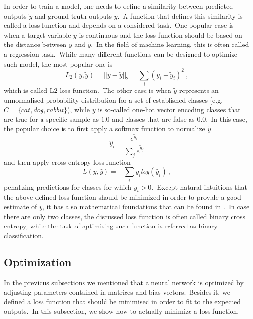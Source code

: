\documentclass[longabstract, english, mgr]{iithesis}
\theoremstyle{default_theorem_style}\newtheorem{theorem}{Theorem}
\theoremstyle{default_theorem_style}\newtheorem{definition}{Definition}
\begin{document}
In order to train a model, one needs to define a similarity between predicted outputs $\tilde{y}$ and ground-truth
outputs $y$.\ A function that defines this similarity is called a loss function and depends on a considered
task.\ One popular case is when a target variable $y$ is continuous and the loss function should be based on the
distance between $y$ and $\tilde{y}$.\ In the field of machine learning, this is often called a regression
task.\ While many different functions can be designed to optimize such model, the most popular one is
$$
L_2(y, \tilde{y}) = ||y - \tilde{y}||_2 = \sum_i (y_i - \tilde{y}_i)^2\ ,
$$
which is called L2 loss function.\ The other case is when $\tilde{y}$ represents an unnormalised probability
distribution for a set of established classes (e.g.\ $C = \{cat, dog, rabbit\}$), while $y$ is so-called one-hot
vector encoding classes that are true for a specific sample as $1.0$ and classes that are false as $0.0$.\ In
this case, the popular choice is to first apply a softmax function to normalize $\tilde{y}$
$$
\hat{y}_i = \frac{e^{\tilde{y}_i}}{\sum_j e^{\tilde{y}_j}}
$$
and then apply cross-entropy loss function
$$
L(y, \hat{y}) = -\sum_i y_i log(\hat{y}_i)\ ,
$$
penalizing predictions for classes for which $y_i > 0$.\ Except natural intuitions that the above-defined loss
function should be minimized in order to provide a good estimate of $y$, it has also mathematical foundations that
can be found in \cite{goodfellow_book}.\ In case there are only two classes, the discussed loss function is often
called binary cross entropy, while the task of optimising such function is referred as binary classification.

\subsection{Optimization}\label{subsec:optimization}

In the previous subsections we mentioned that a neural network is optimized by adjusting parameters contained in
matrices and bias vectors.\ Besides it, we defined a loss function that should be minimised in order to fit to the
expected outputs.\ In this subsection, we show how to actually minimize a loss function.\newline
\end{document}
